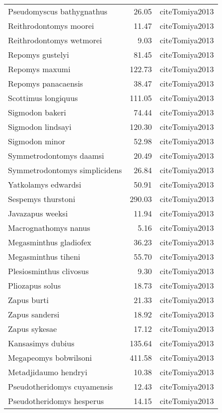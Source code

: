 \begin{table}[ht]
\begin{tabular}{lrl}
  Pseudomyscus bathygnathus & 26.05 & cite{Tomiya2013} \\ 
  Reithrodontomys moorei & 11.47 & cite{Tomiya2013} \\ 
  Reithrodontomys wetmorei & 9.03 & cite{Tomiya2013} \\ 
  Repomys gustelyi & 81.45 & cite{Tomiya2013} \\ 
  Repomys maxumi & 122.73 & cite{Tomiya2013} \\ 
  Repomys panacaensis & 38.47 & cite{Tomiya2013} \\ 
  Scottimus longiquus & 111.05 & cite{Tomiya2013} \\ 
  Sigmodon bakeri & 74.44 & cite{Tomiya2013} \\ 
  Sigmodon lindsayi & 120.30 & cite{Tomiya2013} \\ 
  Sigmodon minor & 52.98 & cite{Tomiya2013} \\ 
  Symmetrodontomys daamsi & 20.49 & cite{Tomiya2013} \\ 
  Symmetrodontomys simplicidens & 26.84 & cite{Tomiya2013} \\ 
  Yatkolamys edwardsi & 50.91 & cite{Tomiya2013} \\ 
  Sespemys thurstoni & 290.03 & cite{Tomiya2013} \\ 
  Javazapus weeksi & 11.94 & cite{Tomiya2013} \\ 
  Macrognathomys nanus & 5.16 & cite{Tomiya2013} \\ 
  Megasminthus gladiofex & 36.23 & cite{Tomiya2013} \\ 
  Megasminthus tiheni & 55.70 & cite{Tomiya2013} \\ 
  Plesiosminthus clivosus & 9.30 & cite{Tomiya2013} \\ 
  Pliozapus solus & 18.73 & cite{Tomiya2013} \\ 
  Zapus burti & 21.33 & cite{Tomiya2013} \\ 
  Zapus sandersi & 18.92 & cite{Tomiya2013} \\ 
  Zapus sykesae & 17.12 & cite{Tomiya2013} \\ 
  Kansasimys dubius & 135.64 & cite{Tomiya2013} \\ 
  Megapeomys bobwilsoni & 411.58 & cite{Tomiya2013} \\ 
  Metadjidaumo hendryi & 10.38 & cite{Tomiya2013} \\ 
  Pseudotheridomys cuyamensis & 12.43 & cite{Tomiya2013} \\ 
  Pseudotheridomys hesperus & 14.15 & cite{Tomiya2013} \\ 

\end{tabular}
\end{table}
